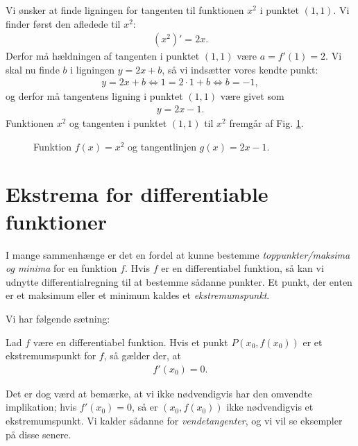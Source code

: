 \begin{exa}
Vi ønsker at finde ligningen for tangenten til funktionen $x^2$ i punktet $(1,1)$. Vi finder først den afledede til $x^2$:
\begin{align*}
(x^2)' = 2x.
\end{align*}
Derfor må hældningen af tangenten i punktet $(1,1)$ være $a = f'(1) = 2$. Vi skal nu finde $b$ i ligningen $y=2x+b$, så vi indsætter vores kendte punkt:
\begin{align*}
y = 2x+b \Leftrightarrow 1= 2\cdot 1 +b \Leftrightarrow b = -1,
\end{align*}
og derfor må tangentens ligning i punktet $(1,1)$ være givet som
\begin{align*}
y = 2x-1.
\end{align*}
Funktionen $x^2$ og tangenten i punktet $(1,1)$ til $x^2$ fremgår af Fig. \ref{fig:tangent}.

\begin{figure}[H]
	\centering
	\caption{Funktion $f(x)=x^2$ og tangentlinjen $g(x) = 2x-1$.}
	\label{fig:tangent}
\end{figure}
\end{exa}
\section*{Ekstrema for differentiable funktioner}

I mange sammenhænge er det en fordel at kunne bestemme \textit{toppunkter/maksima og minima} for en funktion $f$. Hvis $f$ er en differentiabel funktion, så kan vi udnytte differentialregning til at bestemme sådanne punkter. Et punkt, der enten er et maksimum eller et minimum kaldes et \textit{ekstremumspunkt}. 

Vi har følgende sætning:
\begin{setn}[Ekstremumspunkter]
	Lad $f$ være en differentiabel funktion. Hvis et punkt $P(x_0,f(x_0))$ er et ekstremumspunkt for $f$, så gælder der, at 
	\begin{align*}
		f'(x_0) = 0.
	\end{align*}
\end{setn}
Det er dog værd at bemærke, at vi ikke nødvendigvis har den omvendte implikation; hvis $f'(x_0)=0$, så er $(x_0,f(x_0))$ ikke nødvendigvis et ekstremumspunkt. Vi kalder sådanne for \textit{vendetangenter}, og vi vil se eksempler på disse senere. 

